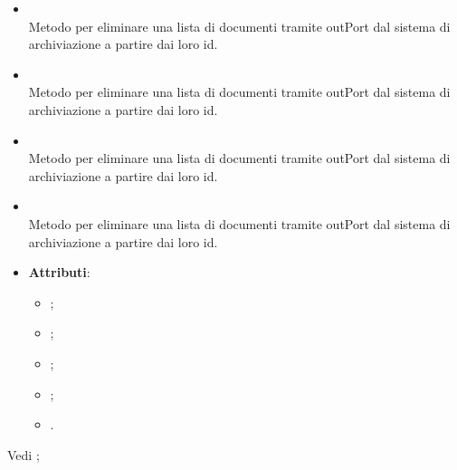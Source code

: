 \documentclass[10pt, a4paper]{article}
\begin{document}
\begin{itemize}
\begin{itemize}
        \item {}\\ 
        Metodo per eliminare una lista di documenti tramite outPort dal sistema di archiviazione a partire dai loro id.

        \item {}\\
        Metodo per eliminare una lista di documenti tramite outPort dal sistema di archiviazione a partire dai loro id.

        \item {}\\ 
        Metodo per eliminare una lista di documenti tramite outPort dal sistema di archiviazione a partire dai loro id.

        \item {}\\ 
        Metodo per eliminare una lista di documenti tramite outPort dal sistema di archiviazione a partire dai loro id.
    \end{itemize}
\end{itemize}


\label{PostgresConfigurationDettaglio}
\begin{itemize}
    \item \textbf{Attributi}:
    \begin{itemize}
        \item {};
        \item {};
        \item {};
        \item {};
        \item {}. 
    \end{itemize}
\end{itemize}

Vedi ;
\end{document}
